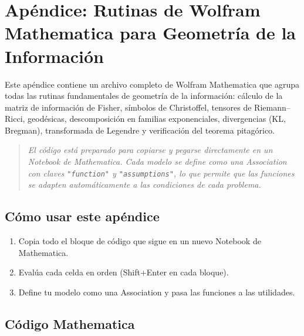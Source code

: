 
\chapter*{Apéndice: Rutinas de Wolfram Mathematica para Geometría de la Información}

Este apéndice contiene un archivo completo de Wolfram Mathematica que agrupa todas las rutinas fundamentales de geometría de la información: cálculo de la matriz de información de Fisher, símbolos de Christoffel, tensores de Riemann--Ricci, geodésicas, descomposición en familias exponenciales, divergencias (KL, Bregman), transformada de Legendre y verificación del teorema pitagórico.

\begin{quotation}
	\itshape
	El código está preparado para copiarse y pegarse directamente en un Notebook de Mathematica.  Cada modelo se define como una \emph{Association} con claves \texttt{"function"} y \texttt{"assumptions"}, lo que permite que las funciones se adapten automáticamente a las condiciones de cada problema.
\end{quotation}

\section{Cómo usar este apéndice}
\begin{enumerate}
	\item Copia todo el bloque de código que sigue en un nuevo Notebook de Mathematica.
	\item Evalúa cada celda en orden (Shift+Enter en cada bloque).
	\item Define tu modelo como una Association y pasa las funciones a las utilidades.
\end{enumerate}

\section{Código Mathematica}

